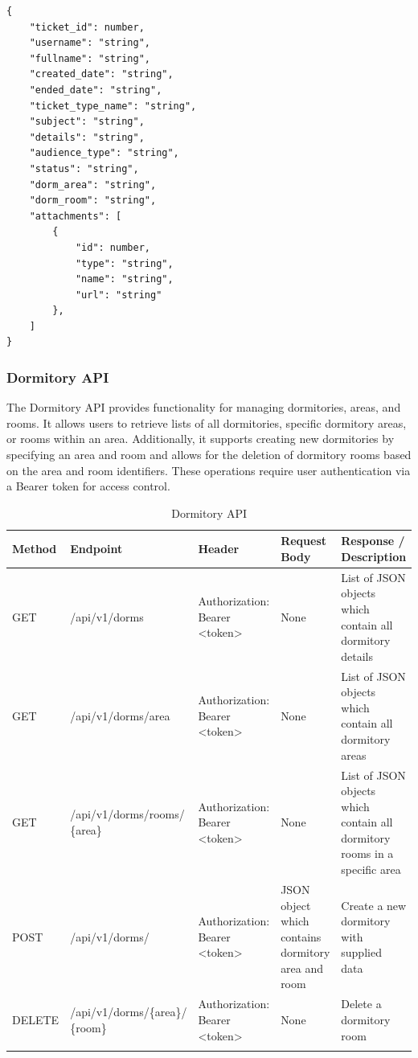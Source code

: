 \begin{lstlisting}[breaklines=true, caption=Ticket Scheme]
{
	"ticket_id": number,
	"username": "string",
	"fullname": "string",
	"created_date": "string",
	"ended_date": "string",
	"ticket_type_name": "string",
	"subject": "string",
	"details": "string",
	"audience_type": "string",
	"status": "string",
	"dorm_area": "string",
	"dorm_room": "string",
	"attachments": [
		{
			"id": number,
			"type": "string",
			"name": "string",
			"url": "string"
		},
	]
}
\end{lstlisting}



\subsubsection{Dormitory API}
The Dormitory API provides functionality for managing dormitories, areas, and rooms. It allows users to retrieve lists of all dormitories, specific dormitory areas, or rooms within an area. Additionally, it supports creating new dormitories by specifying an area and room and allows for the deletion of dormitory rooms based on the area and room identifiers. These operations require user authentication via a Bearer token for access control.
\begin{longtable}{|m{1.6cm}|m{5cm}|m{3cm}|m{3cm}|m{3.2cm}|}
	\hline
	\textbf{Method} & \textbf{Endpoint} & \textbf{Header}                                                                                                                            & \textbf{Request Body} & \textbf{Response / Description}   \\ \hline
	\endhead
	
	GET & /api/v1/dorms & Authorization: Bearer <token> & None & List of JSON objects which contain all dormitory details \\ \hline
	
	GET & /api/v1/dorms/area & Authorization: Bearer <token> & None  & List of JSON objects which contain all dormitory areas\\ \hline
	
	GET & /api/v1/dorms/rooms/ \newline \{area\} & Authorization: Bearer <token> & None  & List of JSON objects which contain all dormitory rooms in a specific area\\ \hline
	
	POST & /api/v1/dorms/ & Authorization: Bearer <token> & JSON object which contains dormitory area and room  & Create a new dormitory with supplied data \\ \hline
	
	DELETE & /api/v1/dorms/\{area\}/ \newline \{room\}  & Authorization: Bearer <token> & None  & Delete a dormitory room \\ \hline

	
	\caption{Dormitory API}
	\label{tab:dorm-api}
	
\end{longtable}


